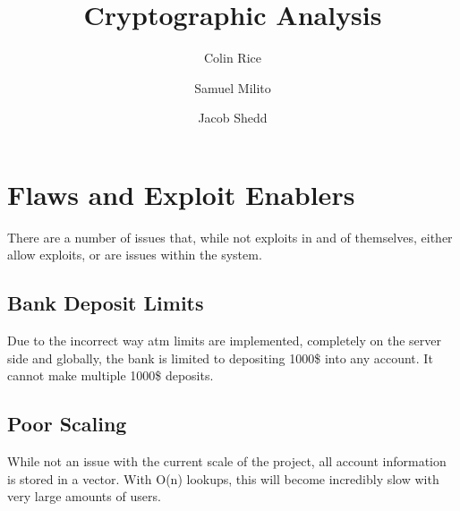 \documentclass{article}
\begin{document}
\title{Cryptographic Analysis}
\author{Colin Rice}
\author{Samuel Milito}
\author{Jacob Shedd}

\maketitle

\section{Flaws and Exploit Enablers}
There are a number of issues that, while not exploits in and of themselves, either allow exploits, or are issues within the system.

\subsection{Bank Deposit Limits}
Due to the incorrect way atm limits are implemented, completely on the server side and globally, the bank is limited to depositing 1000\$ into any account. It cannot make multiple 1000\$ deposits.

\subsection{Poor Scaling}
While not an issue with the current scale of the project, all account information is stored in a vector. With O(n) lookups, this will become incredibly slow with very large amounts of users.
\end{document}
